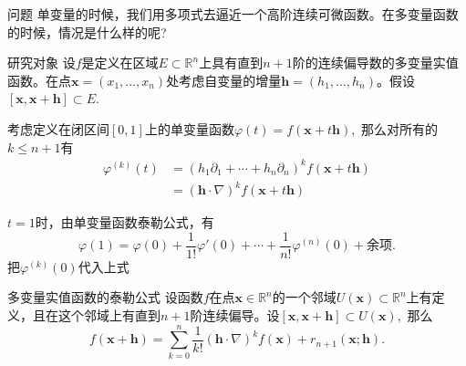 \begin{frame}

\begin{block}{问题}
单变量的时候，我们用多项式去逼近一个高阶连续可微函数。在多变量函数的时候，情况是什么样的呢?
\end{block}

\vspace{2em}
\pause

\begin{block}{研究对象}
设$f$是定义在区域$E\subset \mathbb{R}^n$上具有直到$n+1$阶的连续偏导数的多变量实值函数。在点$\mathbf{x} = (x_1,\ldots,x_n)$处考虑自变量的增量$\mathbf{h} = (h_1,\ldots,h_n)$。假设$[\mathbf{x}, \mathbf{x} + \mathbf{h}] \subset E.$
\end{block}

\end{frame}


\begin{frame}

\begin{lem}
考虑定义在闭区间$[0,1]$上的单变量函数$\varphi(t) = f(\mathbf{x} + t\mathbf{h}),$ 那么对所有的$k\leqslant n+1$有
\begin{align*}
\varphi^{(k)}(t) & = \left( h_1\partial_1 + \cdots + h_n\partial_n \right)^k f(\mathbf{x} + t\mathbf{h}) \\
& = (\mathbf{h}\cdot\nabla)^k f(\mathbf{x} + t\mathbf{h})
\end{align*}
\end{lem}

\pause

$t=1$时，由单变量函数泰勒公式，有
\[\varphi(1) = \varphi(0) + \dfrac{1}{1!}\varphi'(0) + \cdots + \dfrac{1}{n!}\varphi^{(n)}(0) + \text{余项}.\]
把$\varphi^{(k)}(0)$代入上式

\end{frame}


\begin{frame}

\begin{block}{多变量实值函数的泰勒公式}
设函数$f$在点$\mathbf{x} \in \mathbb{R}^n$的一个邻域$U(\mathbf{x}) \subset \mathbb{R}^n$上有定义，且在这个邻域上有直到$n+1$阶连续偏导。设$[\mathbf{x}, \mathbf{x} + \mathbf{h}] \subset U(\mathbf{x}),$ 那么
\[f(\mathbf{x} + \mathbf{h}) = \sum\limits_{k=0}^n \dfrac{1}{k!} (\mathbf{h}\cdot\nabla)^k f(\mathbf{x}) + r_{n+1}(\mathbf{x}; \mathbf{h}).\]
\end{block}

\end{frame}

